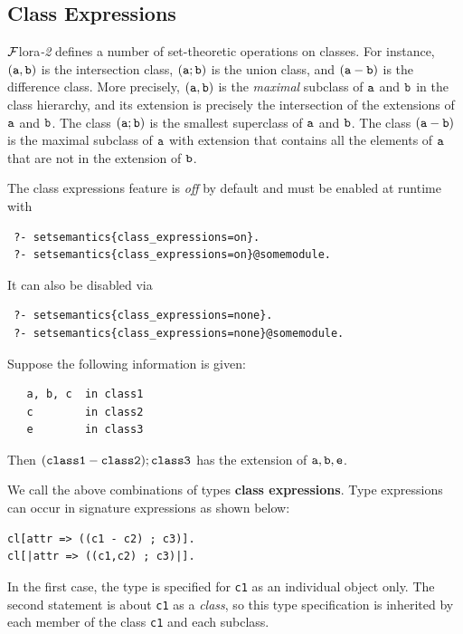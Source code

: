 \documentclass[11pt]{article}
\newcommand{\FLORA}{{\mbox{\sc ${\cal F}${lora}\rm\emph{-2}}}\xspace}
\newcommand{\FLSYSTEM}{\FLORA}
\begin{document}
\subsection{Class Expressions}
\label{sec-class-expr}

\FLSYSTEM defines a number of set-theoretic
operations on classes. For instance, $\tt (a,b)$ is the
intersection class, $\tt (a;b)$ is the union class, and $\tt (a-b)$ is
the difference class. More precisely, $\tt (a,b)$ is the \emph{maximal}
subclass of $\tt a$ and $\tt b$ in the class hierarchy, and its extension is
precisely the intersection of the extensions of $\tt a$ and $\tt b$. The class
$\tt (a;b)$ is the smallest superclass of $\tt a$ and $\tt b$. The class $\tt (a-b)$ is the
maximal subclass of $\tt a$ with extension that contains all the elements of
$\tt a$ that are not in the extension of $\tt b$.

The class expressions feature is \emph{off} by default and must be enabled
at runtime with
\begin{verbatim}
 ?- setsemantics{class_expressions=on}.
 ?- setsemantics{class_expressions=on}@somemodule.
\end{verbatim}
It can also be disabled via
\begin{verbatim}
 ?- setsemantics{class_expressions=none}.
 ?- setsemantics{class_expressions=none}@somemodule.
\end{verbatim}

Suppose the following information is given:
\begin{verbatim}
   a, b, c  in class1
   c        in class2
   e        in class3
\end{verbatim}
Then $\tt (class1 - class2) ; class3$ has the extension of $\tt a,b,e$.

We call the above combinations of types {\bf class expressions}.  
Type expressions can occur in signature expressions as shown below:
\begin{verbatim}
cl[attr => ((c1 - c2) ; c3)].
cl[|attr => ((c1,c2) ; c3)|].
\end{verbatim}
In the first case, the type is specified for \texttt{c1} as an individual
object only.
The second statement is about \texttt{c1} as a \emph{class}, so this type
specification is inherited by each member of the class \texttt{c1} and each
subclass.   
\end{document}
